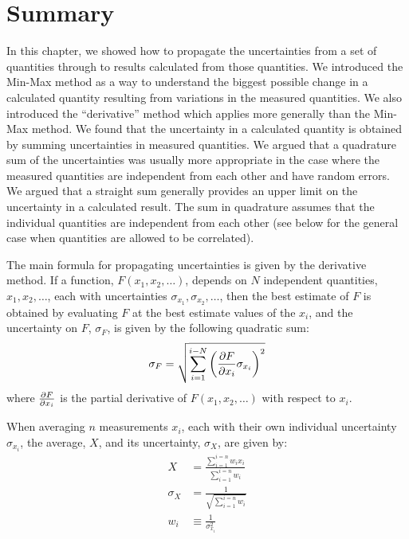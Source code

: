 \section{Summary}
In this chapter, we showed how to propagate the uncertainties from a set of quantities through to results calculated from those quantities. We introduced the Min-Max method as a way to understand the biggest possible change in a calculated quantity resulting from variations in the measured quantities. We also introduced the ``derivative'' method which applies more generally than the Min-Max method. We found that the uncertainty in a calculated quantity is obtained by summing uncertainties in measured quantities. We argued that a quadrature sum of the uncertainties was usually more appropriate in the case where the measured quantities are independent from each other and have random errors. We argued that a straight sum generally provides an upper limit on the uncertainty in a calculated result. The sum in quadrature assumes that the individual quantities are independent from each other (see below for the general case when quantities are allowed to be correlated).

The main formula for propagating uncertainties is given by the derivative method. If a function, $F(x_1, x_2, \dots)$, depends on $N$ independent quantities, $x_1, x_2, \dots$, each with uncertainties $\sigma_{x_1}, \sigma_{x_2}, \dots$, then the best estimate of $F$ is obtained by evaluating $F$ at the best estimate values of the $x_i$, and the uncertainty on $F$, $\sigma_{F}$, is given by the following quadratic sum:
\begin{align}
\sigma_{F} = \sqrt{\sum_{i=1}^{i-N}\left(\frac{\partial F}{\partial x_i}\sigma_{x_i}\right)^2}
\end{align}
where $\frac{\partial F}{\partial x_i}$ is the partial derivative of $F(x_1, x_2, \dots)$ with respect to $x_i$.

When averaging $n$ measurements $x_i$, each with their own individual uncertainty $\sigma_{x_i}$, the average, $X$, and its uncertainty, $\sigma_{X}$, are given by:
\begin{align*}
X &= \frac{\sum_{i=1}^{i=n}w_ix_i}{\sum_{i=1}^{i=n}w_i}\\
\sigma_{X} &= \frac{1}{\sqrt{\sum_{i=1}^{i=n}w_i}}\\
w_i&\equiv\frac{1}{\sigma_{x_i}^2}
\end{align*}

